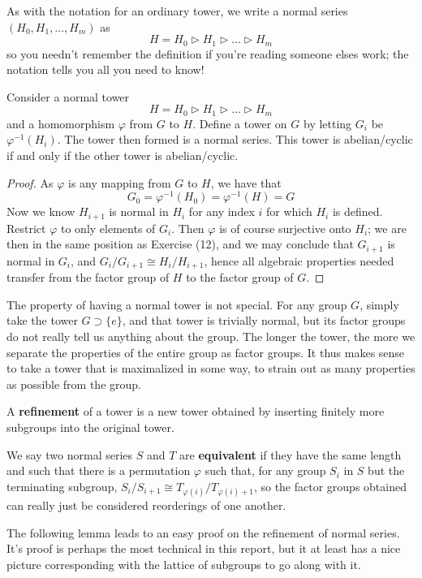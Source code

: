 As with the notation for an ordinary tower, we write a normal series $(H_0, H_1, \dots, H_m)$ as
%
\[ H = H_0 \rhd H_1 \rhd \dots \rhd H_m \]
%
so you needn't remember the definition if you're reading someone elses work; the notation tells you all you need to know!

\begin{theorem}
    Consider a normal tower
    \[ H = H_0 \rhd H_1 \rhd \dots \rhd H_m \]
    and a homomorphism $\varphi$ from $G$ to $H$. Define a tower on $G$ by letting $G_i$ be $\varphi^{-1}(H_i)$. The tower then formed is a normal series. This tower is abelian/cyclic if and only if the other tower is abelian/cyclic.
\end{theorem}
\begin{proof}
    As $\varphi$ is any mapping from $G$ to $H$, we have that
    \[ G_0 = \varphi^{-1}(H_0) = \varphi^{-1}(H) = G \]
    Now we know $H_{i+1}$ is normal in $H_i$ for any index $i$ for which $H_i$ is defined. Restrict $\varphi$ to only elements of $G_i$. Then $\varphi$ is of course surjective onto $H_i$; we are then in the same position as Exercise (12), and we may conclude that $G_{i+1}$ is normal in $G_i$, and $G_i/G_{i+1} \cong H_i/H_{i+1}$, hence all algebraic properties needed transfer from the factor group of $H$ to the factor group of $G$.
\end{proof}

The property of having a normal tower is not special. For any group $G$, simply take the tower $G \supset \{e\}$, and that tower is trivially normal, but its factor groups do not really tell us anything about the group. The longer the tower, the more we separate the properties of the entire group as factor groups. It thus makes sense to take a tower that is maximalized in some way, to strain out as many properties as possible from the group.

A {\bf refinement} of a tower is a new tower obtained by inserting finitely more subgroups into the original tower.

We say two normal series $S$ and $T$ are {\bf equivalent}  if they have the same length and such that there is a permutation $\varphi$ such that, for any group $S_i$ in $S$ but the terminating subgroup, $S_i/S_{i+1} \cong T_{\varphi(i)}/T_{\varphi(i) + 1}$, so the factor groups obtained can really just be considered reorderings of one another.

The following lemma leads to an easy proof on the refinement of normal series. It's proof is perhaps the most technical in this report, but it at least has a nice picture corresponding with the lattice of subgroups to go along with it.%

